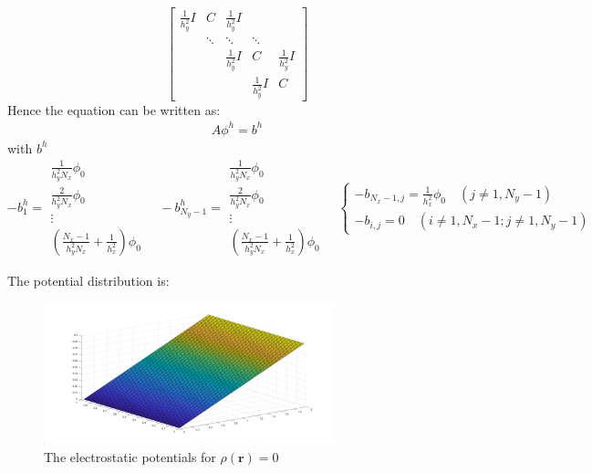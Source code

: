 \documentclass[a4paper,11pt]{article}
\begin{document}
\begin{enumerate}
\begin{enumerate}
\begin{equation}
\begin{bmatrix}
              \frac{1}{h_y^2}I & C & \frac{1}{h_y^2}I \\
              &\ddots & \ddots & \ddots \\
              &  & \frac{1}{h_y^2}I & C & \frac{1}{h_y^2}I \\
              &  &   & \frac{1}{h_y^2}I & C
          \end{bmatrix}    
    \end{equation}
    Hence the equation can be written as:
    \begin{eqnarray}
      A\phi^{h}=b^{h}
    \end{eqnarray}
    with $b^{h}$
    \begin{equation}
      -b_{1}^{h}=
        \begin{array}{|c|}
          \frac{1}{h_y^2N_x}\phi_0\\
          \frac{2}{h_y^2N_x}\phi_0\\
          \vdots\\
          (\frac{N_x-1}{h_y^2N_x}+\frac{1}{h_x^2})\phi_0
        \end{array}
      \quad
      -b_{N_y-1}^{h}=
        \begin{array}{|c|}
          \frac{1}{h_y^2N_x}\phi_0\\
          \frac{2}{h_y^2N_x}\phi_0\\
          \vdots\\
          (\frac{N_x-1}{h_y^2N_x}+\frac{1}{h_x^2})\phi_0
        \end{array}
      \nonumber
      \quad
      \begin{cases}
        -b_{N_x-1,j}=\frac{1}{h_x^2}\phi_0\quad(j\neq 1,N_y-1)\\
        -b_{i,j}=0\quad(i\neq 1,N_x-1;j\neq 1,N_y-1)
      \end{cases}
    \end{equation}

    The potential distribution is:
    \begin{figure}[h]
      \centering
      \includegraphics[width=0.75\textwidth]{fig6.png}\caption{The electrostatic potentials for $\rho(\boldsymbol{r})=0$}
    \end{figure}
    

\end{enumerate}
\end{enumerate}
\end{document}
